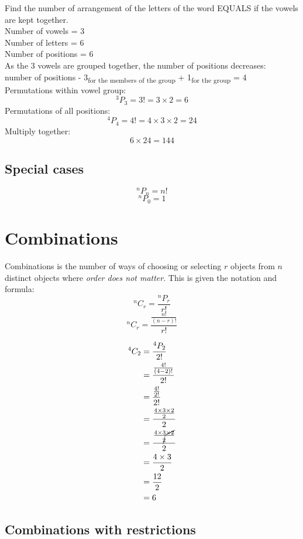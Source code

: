 \documentclass{book}
\begin{document}
Find the number of arrangement of the letters of the word EQUALS if the vowels are kept together.\\
Number of vowels = 3\\
Number of letters = 6\\
Number of positions = 6\\
As the 3 vowels are grouped together, the number of positions decreases:\\ number of positions - 3\textsubscript{for the members of the group} + 1\textsubscript{for the group} = 4\\
Permutations within vowel group:
\[^3P_3 = 3! = 3 \times 2 = 6\]
Permutations of all positions:
\[^4P_4 = 4! = 4 \times 3 \times 2 = 24\]
Multiply together:
\[6 \times 24 = 144\]

\section{Special cases}
\[^nP_n = n!\]
\[^nP_0 = 1\]


\chapter{Combinations}
Combinations is the number of ways of choosing or selecting $r$ objects from $n$ distinct objects where \emph{order does not matter}.  This is given the notation and formula:
\[^nC_r = \frac{^nP_r}{r!}\]
\[^nC_r = \frac{\frac{n!}{(n-r)!}}{r!}\]

\begin{align*}
	^4C_2 & = \frac{^4P_2}{2!}                                          \\
	      & = \frac{\frac{4!}{(4 - 2)!}}{2!}                            \\
	      & = \frac{\frac{4!}{2!}}{2!}                                  \\
	      & = \frac{\frac{4 \times 3 \times 2}{2}}{2}                   \\
	      & = \frac{\frac{4 \times 3 \cancel{\times 2}}{\cancel{2}}}{2} \\
	      & = \frac{4 \times 3}{2}                                      \\
	      & = \frac{12}{2}                                              \\
	      & = 6                                                         \\
\end{align*}

\section{Combinations with restrictions}
\end{document}

